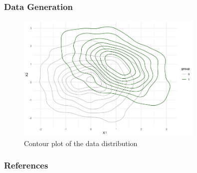 \documentclass{beamer}
\begin{document}
\begin{frame}
  \frametitle{Data Generation}
  \begin{figure}
    \centering
    \includegraphics[width=0.8\textwidth]{figures/contour_data.png}
    \caption{Contour plot of the data distribution}
    \label{fig:contour_data}
  \end{figure}
\end{frame}


















\begin{frame}
  \frametitle{References}
  \nocite{*}
  \printbibliography
\end{frame}
\end{document}
